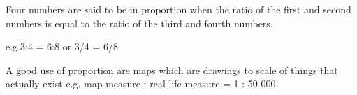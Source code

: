 Four numbers are said to be in proportion when the ratio of the first and second numbers 
is equal to the ratio of the third and fourth numbers.

\par
e.g.3:4 = 6:8 or 3/4 = 6/8

\par
A good use of proportion are maps which are drawings to scale of things that actually exist
e.g.
 map measure : real life measure =   1 : 50 000